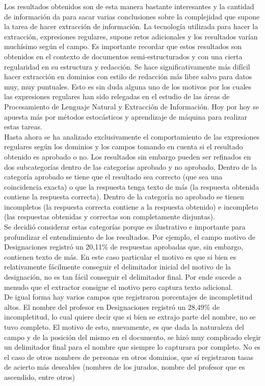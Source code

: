 Los resultados obtenidos son de esta manera bastante interesantes y la cantidad de información da para sacar varias conclusiones sobre la complejidad que supone la tarea de hacer extracción de información. La tecnología utilizada para hacer la extracción, expresiones regulares, supone retos adicionales y los resultados varían muchísimo según el campo. Es importante recordar que estos resultados son obtenidos en el contexto de documentos semi-estructurados y con una cierta regularidad en su estructura y redacción. Se hace significativamente más difícil hacer extracción en dominios con estilo de redacción más libre salvo para datos muy, muy puntuales. Esto es sin duda alguna uno de los motivos por los cuales las expresiones regulares han sido relegadas en el estudio de las áreas de Procesamiento de Lenguaje Natural y Extracción de Información. Hoy por hoy se apuesta más por métodos estocásticos y aprendizaje de máquina para realizar estas tareas. \\

Hasta ahora se ha analizado exclusivamente el comportamiento de las expresiones regulares según los dominios y los campos tomando en cuenta si el resultado obtenido es aprobado o no. Los resultados sin embargo pueden ser refinados en dos subcategorías dentro de las categorías aprobado y no aprobado. Dentro de la categoría aprobado se tiene que el resultado sea correcto (que sea una coincidencia exacta) o que la respuesta tenga texto de más (la respuesta obtenida contiene la respuesta correcta). Dentro de la categoría no aprobado se tienen incompletos (la respuesta correcta contiene a la respuesta obtenido) e incompleto (las respuestas obtenidas y correctas son completamente disjuntas). \\

Se decidió considerar estas categorías porque es ilustrativo e importante para profundizar el entendimiento de los resultados. Por ejemplo, el campo motivo de Designaciones registró un 20,11\% de respuestas aprobadas que, sin embargo, contienen texto de más. En este caso particular el motivo es que si bien es relativamente fácilmente conseguir el delimitador inicial del motivo de la designación, no es tan fácil conseguir el delimitador final. Por ende sucede a menudo que el extractor consigue el motivo pero captura texto adicional. \\

De igual forma hay varios campos que registraron porcentajes de incompletitud altos. El nombre del profesor en Designaciones registró un 28,49\% de incompletitud, lo cual quiere decir que si bien se extrajo parte del nombre, no se tuvo completo. El motivo de esto, nuevamente, es que dada la naturaleza del campo y de la posición del mismo en el documento, se hizó muy complicado elegir un delimitador final para el nombre que siempre lo capturara por completo. No es el caso de otros nombres de personas en otros dominios, que sí registraron tasas de acierto más deseables (nombres de los jurados, nombre del profesor que es ascendido, entre otros)\\

